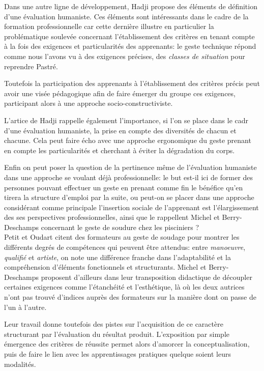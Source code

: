 \documentclass{article}
\begin{document}
Dans une autre ligne de développement, Hadji \cite{hadji_pour_2019}
propose des éléments de définition d'une évaluation humaniste. Ces
éléments sont intéressants dans le cadre de la formation professionnelle
car cette dernière illustre en particulier la problématique soulevée
concernant l'établissement des critères en tenant compte à la fois des
exigences et particularités des apprenants: le geste technique répond
comme nous l'avons vu à des exigences précises, des \emph{classes de
situation} pour reprendre Pastré.

Toutefois la participation des apprenants à l'établissement des critères
précis peut avoir une visée pédagogique afin de faire émerger du groupe
ces exigences, participant alors à une approche socio-constructiviste.

L'artice de Hadji rappelle également l'importance, si l'on se place dans
le cadr d'une évaluation humaniste, la prise en compte des diversités de
chacun et chacune. Cela peut faire écho avec une approche ergonomique du
geste prenant en compte les particularités et cherchant à éviter la
dégradation du corps.

Enfin on peut poser la question de la pertinence même de l'évaluation
humaniste dans une approche se voulant déjà professionnelle: le but
est-il ici de former des personnes pouvant effectuer un geste en prenant
comme fin le bénéfice qu'en tirera la structure d'emploi par la suite,
ou peut-on se placer dans une approche considérant comme principale 
l'insertion sociale de l'apprenant est l'élargissement des ses
perspectives professionnelles, ainsi que le rappellent Michel et
Berry-Deschamps \cite{michel_lapprentissage_2008} concernant le geste
de soudure chez les pisciniers ? 
\\

Petit et Oudart \cite{petit_apprendre_2017} citent des formateurs au 
geste de soudage pour montrer les différents degrés de compétences qui 
peuvent être attendus: entre \emph{manoeuvre}, \emph{qualifié} et 
\emph{artiste}, on note une différence franche dans l'adaptabilité et la 
compréhension d'éléments fonctionnels et structurants.
Michel et Berry-Deschamps \cite{michel_lapprentissage_2008} proposent 
d'ailleurs dans leur transposition didactique de découpler certaines 
exigences comme l'étanchéité et l'esthétique, là où les deux autrices 
n'ont pas trouvé d'indices auprès des formateurs sur la manière dont on 
passe de l'un à l'autre.

Leur travail donne toutefois des pistes sur l'acquisition de ce caractère 
structurant par l'évaluation du résultat produit. L'exposition par simple 
émergence des critères de réussite permet alors d'amorcer la 
conceptualisation, puis de faire le lien avec les apprentissages 
pratiques quelque soient leurs modalités.
\end{document}
